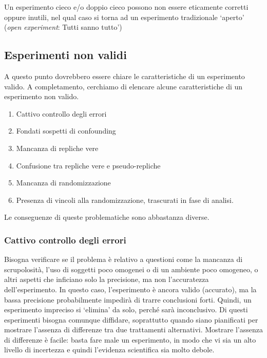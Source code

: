 \documentclass[a4paper,12pt,oneside]{book}
\providecommand{\tightlist}{%
  \setlength{\itemsep}{0pt}\setlength{\parskip}{0pt}}
\theoremstyle{definition}
\theoremstyle{definition}
\theoremstyle{definition}
\theoremstyle{remark}
\begin{document}
Un esperimento cieco e/o doppio cieco possono non essere eticamente
corretti oppure inutili, nel qual caso si torna ad un esperimento
tradizionale `aperto' (\emph{open experiment}: Tutti sanno tutto')

\subsection{Esperimenti non validi}\label{esperimenti-non-validi}

A questo punto dovrebbero essere chiare le caratteristiche di un
esperimento valido. A completamento, cerchiamo di elencare alcune
caratteristiche di un esperimento non valido.

\begin{enumerate}
\def\labelenumi{\arabic{enumi}.}
\tightlist
\item
  Cattivo controllo degli errori
\item
  Fondati sospetti di confounding
\item
  Mancanza di repliche vere
\item
  Confusione tra repliche vere e pseudo-repliche
\item
  Mancanza di randomizzazione
\item
  Presenza di vincoli alla randomizzazione, trascurati in fase di
  analisi.
\end{enumerate}

Le conseguenze di queste problematiche sono abbastanza diverse.

\subsubsection{Cattivo controllo degli
errori}\label{cattivo-controllo-degli-errori}

Bisogna verificare se il problema è relativo a questioni come la
mancanza di scrupolosità, l'uso di soggetti poco omogenei o di un
ambiente poco omogeneo, o altri aspetti che inficiano solo la
precisione, ma non l'accuratezza dell'esperimento. In questo caso,
l'esperimento è ancora valido (accurato), ma la bassa precisione
probabilmente impedirà di trarre conclusioni forti. Quindi, un
esperimento impreciso si `elimina' da solo, perché sarà inconclusivo. Di
questi esperimenti bisogna comunque diffidare, soprattutto quando siano
pianificati per mostrare l'assenza di differenze tra due trattamenti
alternativi. Mostrare l'assenza di differenze è facile: basta fare male
un esperimento, in modo che vi sia un alto livello di incertezza e
quindi l'evidenza scientifica sia molto debole.
\end{document}
